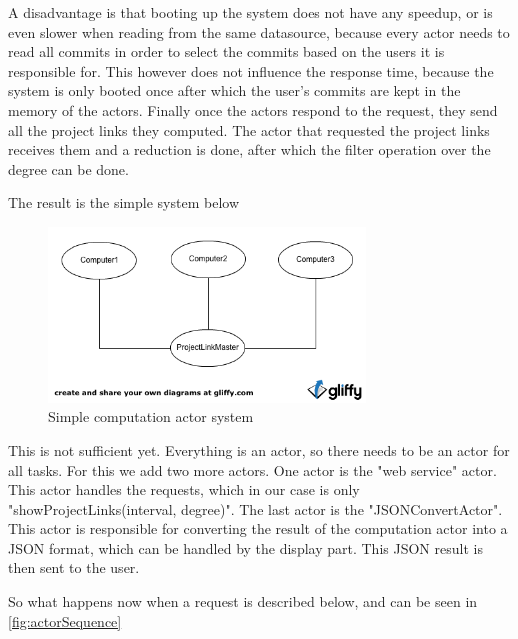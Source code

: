 \documentclass[10pt,a4paper]{article}
\begin{document}
A disadvantage is that booting up the system does not have any speedup, or is even slower when reading from the same datasource, because every actor needs to read all commits in order to select the commits based on the users it is responsible for. This however does not influence the response time, because the system is only booted once after which the user's commits are kept in the memory of the actors. Finally once the actors respond to the request, they send all the project links they computed. The actor that requested the project links receives them and a reduction is done, after which the filter operation over the degree can be done.

The result is the simple system below

\begin{figure}[htb]
    \centering
    \includegraphics[width=0.75\textwidth]{actors_simple}
    \caption{Simple computation actor system}
    \label{fig:simple computation actor system}
\end{figure}


This is not sufficient yet. Everything is an actor, so there needs to be an actor for all tasks. For this we add two more actors. One actor is the "web service" actor. This actor handles the requests, which in our case is only "showProjectLinks(interval, degree)". The last actor is the "JSONConvertActor". This actor is responsible for converting the result of the computation actor into a JSON format, which can be handled by the display part. This JSON result is then sent to the user.

So what happens now when a request is described below, and can be seen in \ref{fig:actorSequence}
\end{document}
